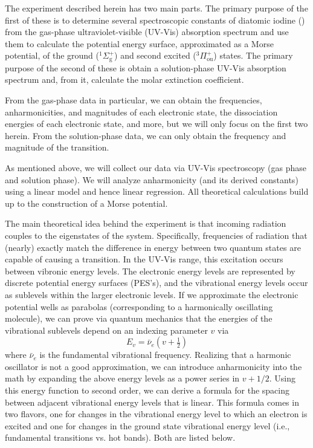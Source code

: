 \documentclass[../labs.tex]{subfiles}
\begin{document}

The experiment described herein has two main parts. The primary purpose of the first of these is to determine several spectroscopic constants of diatomic iodine () from the gas-phase ultraviolet-visible (UV-Vis) absorption spectrum and use them to calculate the potential energy surface, approximated as a Morse potential, of the ground (${}^1\Sigma_\text{g}^+$) and second excited (${}^3\Pi_\text{ou}^+$) states\supercites{bib:LabManual}{bib:McNaughtI2}. The primary purpose of the second of these is obtain a solution-phase UV-Vis absorption spectrum and, from it, calculate the molar extinction coefficient.\par
From the gas-phase data in particular, we can obtain the frequencies, anharmonicities, and magnitudes of each electronic state, the dissociation energies of each electronic state, and more, but we will only focus on the first two herein\supercite{bib:McNaughtI2}. From the solution-phase data, we can only obtain the frequency and magnitude of the transition.\par
As mentioned above, we will collect our data via UV-Vis spectroscopy (gas phase and solution phase). We will analyze anharmonicity (and its derived constants) using a linear model and hence linear regression. All theoretical calculations build up to the construction of a Morse potential.\par
The main theoretical idea behind the experiment is that incoming radiation couples to the eigenstates of the system. Specifically, frequencies of radiation that (nearly) exactly match the difference in energy between two quantum states are capable of causing a transition. In the UV-Vis range, this excitation occurs between vibronic energy levels. The electronic energy levels are represented by discrete potential energy surfaces (PES's), and the vibrational energy levels occur as sublevels within the larger electronic levels. If we approximate the electronic potential wells as parabolas (corresponding to a harmonically oscillating molecule), we can prove via quantum mechanics that the energies of the vibrational sublevels depend on an indexing parameter $v$ via
\begin{equation*}
    E_v = \bar{\nu}_e\left( v+\tfrac{1}{2} \right)
\end{equation*}
where $\bar{\nu}_e$ is the fundamental vibrational frequency. Realizing that a harmonic oscillator is not a good approximation, we can introduce anharmonicity into the math by expanding the above energy levels as a power series in $v+1/2$. Using this energy function to second order, we can derive a formula for the spacing between adjacent vibrational energy levels that is linear. This formula comes in two flavors, one for changes in the vibrational energy level to which an electron is excited and one for changes in the ground state vibrational energy level (i.e., fundamental transitions vs. hot bands). Both are listed below.
\end{document}
